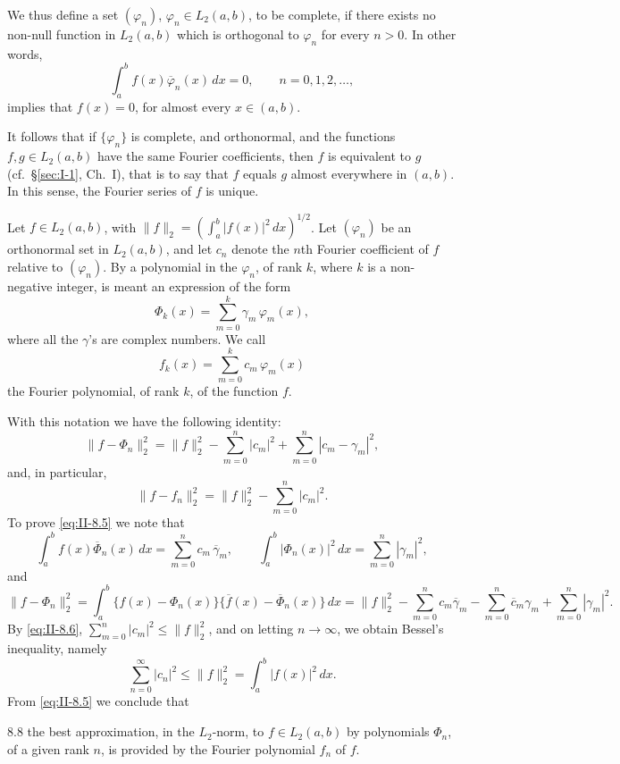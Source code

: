 We thus define a set $(\varphi_{n})$, $\varphi_{n}\in L_{2}(a,b)$, to be complete, if there exists no non-null function in $L_{2}(a,b)$ which is orthogonal to $\varphi_{n}$ for every $n>0$. In other words,
\[
\int_{a}^{b}f(x)\overline{\varphi}_{n}(x)\,dx=0,\qquad n=0,1,2,\dots,
\]
implies that $f(x)=0$, for almost every $x\in(a,b)$.

It follows that if $\{\varphi_{n}\}$ is complete, and orthonormal, and the functions $f,g\in L_{2}(a,b)$ have the same Fourier coefficients, then $f$ is equivalent to $g$ (cf.\ \S\ref{sec:I-1}, Ch.~I), that is to say that $f$ equals $g$ almost everywhere in $(a,b)$. In this sense, the Fourier series of $f$ is unique.

Let $f\in L_{2}(a,b)$, with $\|f\|_{2}=(\int_{a}^{b}|f(x)|^{2}\,dx)^{1/2}$. Let $(\varphi_{n})$ be an orthonormal set in $L_{2}(a,b)$, and let $c_{n}$ denote the $n$th Fourier coefficient of $f$ relative to $(\varphi_{n})$. By a polynomial in the $\varphi_{n}$, of rank $k$, where $k$ is a non-negative integer, is meant an expression of the form
\begin{equation}\tag{8.3}\label{eq:II-8.3}
\Phi_{k}(x)=\sum_{m=0}^{k}\gamma_{m}\,\varphi_{m}(x),
\end{equation}
where all the $\gamma$'s are complex numbers. We call
\begin{equation}\tag{8.4}\label{eq:II-8.4}
f_{k}(x)=\sum_{m=0}^{k}c_{m}\,\varphi_{m}(x)
\end{equation}
the Fourier polynomial, of rank $k$, of the function $f$.

With this notation we have the following identity:
\begin{equation}\tag{8.5}\label{eq:II-8.5}
\|f-\Phi_{n}\|_{2}^{2}
=\|f\|_{2}^{2}-\sum_{m=0}^{n}|c_{m}|^{2}
+\sum_{m=0}^{n}|c_{m}-\gamma_{m}|^{2},
\end{equation}
and, in particular,
\begin{equation}\tag{8.6}\label{eq:II-8.6}
\|f-f_{n}\|_{2}^{2}=\|f\|_{2}^{2}-\sum_{m=0}^{n}|c_{m}|^{2}.
\end{equation}
To prove \eqref{eq:II-8.5} we note that
\[
\int_{a}^{b}f(x)\overline{\Phi}_{n}(x)\,dx
=\sum_{m=0}^{n}c_{m}\,\overline{\gamma}_{m},\qquad
\int_{a}^{b}|\Phi_{n}(x)|^{2}\,dx
=\sum_{m=0}^{n}|\gamma_{m}|^{2},
\]
and
\[
\|f-\Phi_{n}\|_{2}^{2}
=\int_{a}^{b}\bigl\{f(x)-\Phi_{n}(x)\bigr\}\bigl\{\overline{f}(x)-\overline{\Phi}_{n}(x)\bigr\}\,dx
=\|f\|_{2}^{2}-\sum_{m=0}^{n}c_{m}\overline{\gamma}_{m}
-\sum_{m=0}^{n}\overline{c}_{m}\gamma_{m}
+\sum_{m=0}^{n}|\gamma_{m}|^{2}.
\]
By \eqref{eq:II-8.6}, $\sum_{m=0}^{n}|c_{m}|^{2}\le\|f\|_{2}^{2}$, and on letting $n\to\infty$, we obtain Bessel's inequality, namely
\begin{equation}\tag{8.7}\label{eq:II-8.7}
\sum_{n=0}^{\infty}|c_{n}|^{2}\le\|f\|_{2}^{2}
=\int_{a}^{b}|f(x)|^{2}\,dx.
\end{equation}
From \eqref{eq:II-8.5} we conclude that
\begin{nstmt}{8.8}\label{eq:II-8.8}
the best approximation, in the $L_{2}$-norm, to $f\in L_{2}(a,b)$ by polynomials $\Phi_{n}$, of a given rank $n$, is provided by the Fourier polynomial $f_{n}$ of $f$.
\end{nstmt}

